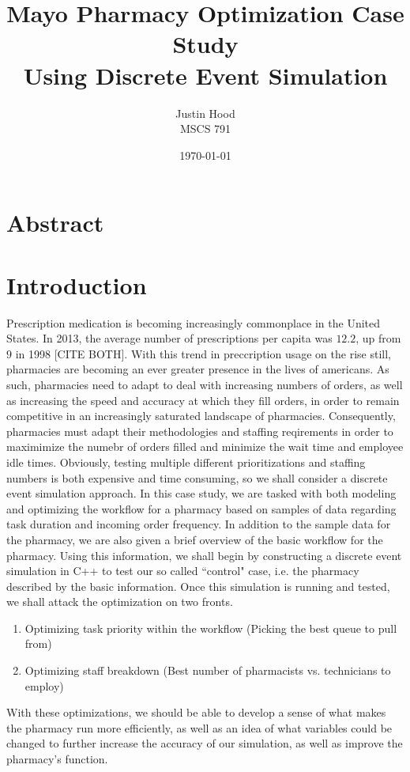 \documentclass[10pt]{report}            %
\title{\bf Mayo Pharmacy Optimization Case Study\\
\large Using Discrete Event Simulation}  %
\author{Justin Hood\\
MSCS 791}              %
\date{\today}                           %
\begin{document}
\maketitle                              %
\setcounter{page}{2}                    %
\newpage
\section*{Abstract}
\section*{Introduction}                %
Prescription medication is becoming increasingly commonplace in the United States. In 2013, the average number of prescriptions per capita was $12.2$, up from $9$ in 1998 [CITE BOTH]. With this trend in preccription usage on the rise still, pharmacies are becoming an ever greater presence in the lives of americans. As such, pharmacies need to adapt to deal with increasing numbers of orders, as well as increasing the speed and accuracy at which they fill orders, in order to remain competitive in an increasingly saturated landscape of pharmacies.  Consequently, pharmacies must adapt their methodologies and staffing reqirements in order to maximimize the numebr of orders filled and minimize the wait time and employee idle times. Obviously, testing multiple different prioritizations and staffing numbers is both expensive and time consuming, so we shall consider a discrete event simulation approach. In this case study, we are tasked with both modeling and optimizing the workflow for a pharmacy based on samples of data regarding task duration and incoming order frequency. In addition to the sample data for the pharmacy, we are also given a brief overview of the basic workflow for the pharmacy. Using this information, we shall begin by constructing a discrete event simulation in C++ to test our so called ``control" case, i.e. the pharmacy described by the basic information. Once this simulation is running and tested, we shall attack the optimization on two fronts.
\begin{enumerate}
\item Optimizing task priority within the workflow (Picking the best queue to pull from)
\item Optimizing staff breakdown (Best number of pharmacists vs. technicians to employ)
\end{enumerate}
With these optimizations, we should be able to develop a sense of what makes the pharmacy run more efficiently, as well as an idea of what variables could be changed to further increase the accuracy of our simulation, as well as improve the pharmacy's function.
\end{document}
